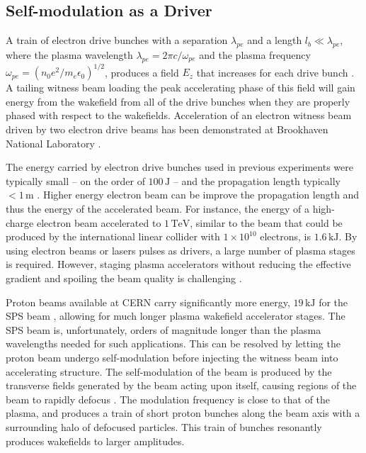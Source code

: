 \documentclass[aps,prstab,reprint,amsmath,amssymb,groupedaddress]{revtex4-1}
\newcommand{\unit}[1]{\,\mathrm{#1}}
\newcommand{\nexp}[1]{\times 10^{#1}}
\begin{document}
\subsection[\label{S:I:SMI}]{Self-modulation as a Driver}

A train of electron drive bunches with a separation $\lambda_{pe}$ and a length $l_{b} \ll \lambda_{pe}$, where the
plasma wavelength $\lambda_{pe} = 2\pi c/\omega_{pe}$ and the plasma frequency $\omega_{pe} = (n_{0} e^{2} / m_{e}
\epsilon_{0})^{1/2}$, produces a field $E_{z}$ that increases for each drive bunch \cite{chen:1985}. A tailing witness
beam loading the peak accelerating phase of this field will gain energy from the wakefield from all of the drive bunches
when they are properly phased with respect to the wakefields. Acceleration of an electron witness beam driven by two
electron drive beams has been demonstrated at Brookhaven National Laboratory \cite{muggli:2011}.

The energy carried by electron drive bunches used in previous experiments were typically small -- on the order of
$100\unit{J}$ -- and the propagation length typically $<1\unit{m}$ \cite{blumenfeld:2007,caldwell:2009}. Higher energy
electron beam can be improve the propagation length and thus the energy of the accelerated beam. For instance, the
energy of a high-charge electron beam accelerated to $1\unit{TeV}$, similar to the beam that could be produced by the
international linear collider with $1\nexp{10}$ electrons, is $1.6\unit{kJ}$. By using electron beams or lasers pulses
as drivers, a large number of plasma stages is required. However, staging plasma accelerators without reducing the
effective gradient and spoiling the beam quality is challenging \cite{steinke:2016,lindstrom:2016}.

Proton beams available at CERN carry significantly more energy, $19\unit{kJ}$ for the SPS beam \cite{gschwendtner:2016},
allowing for much longer plasma wakefield accelerator stages. The SPS beam is, unfortunately, orders of magnitude longer
than the plasma wavelengths needed for such applications. This can be resolved by letting the proton beam undergo
self-modulation before injecting the witness beam into accelerating structure. The self-modulation of the beam is
produced by the transverse fields generated by the beam acting upon itself, causing regions of the beam to rapidly
defocus \cite{kumar:2010}. The modulation frequency is close to that of the plasma, and produces a train of short proton
bunches along the beam axis with a surrounding halo of defocused particles. This train of bunches resonantly produces
wakefields to larger amplitudes.
\end{document}
